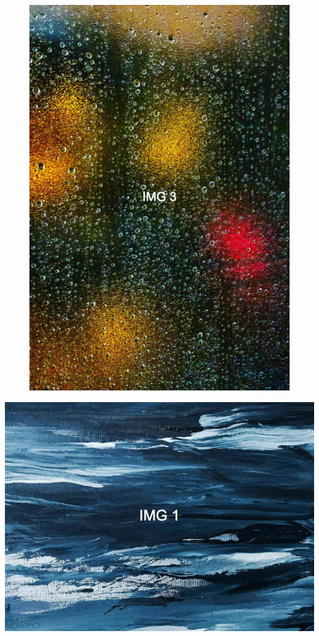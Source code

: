 \documentclass[a0paper,portrait]{baposter}
\begin{document}
\begin{poster}
{\begin{figure}
    \vspace{10pt}
    \begin{center}
        \includegraphics[width=\linewidth]{3.png}
    \end{center}
\end{figure}

\lipsum[6-6][1-4]

\hspace{160pt}\includegraphics[width=0.85\linewidth]{1.png}

}
\end{poster}
\end{document}
